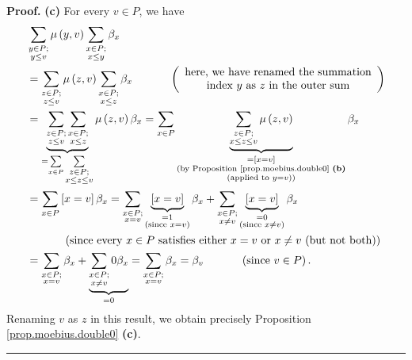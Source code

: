 \documentclass[numbers=enddot,12pt,final,onecolumn,notitlepage]{scrartcl}%
\theoremstyle{definition}
\newenvironment{proof}[1][Proof]{\noindent\textbf{#1.} }{\ \rule{0.5em}{0.5em}}
\newenvironment{vershort}{}{}
\let\sumnonlimits\sum
\renewcommand{\sum}{\sumnonlimits\limits}
\begin{document}
\begin{vershort}
\begin{proof}
\textbf{(c)} For every $v\in P$, we have%
\begin{align*}
&  \sum_{\substack{y\in P;\\y\leq v}}\mu\left(  y,v\right)  \sum
_{\substack{x\in P;\\x\leq y}}\beta_{x}\\
&  =\sum_{\substack{z\in P;\\z\leq v}}\mu\left(  z,v\right)  \sum
_{\substack{x\in P;\\x\leq z}}\beta_{x}\ \ \ \ \ \ \ \ \ \ \left(
\begin{array}
[c]{c}%
\text{here, we have renamed the summation}\\
\text{index }y\text{ as }z\text{ in the outer sum}%
\end{array}
\right) \\
&  =\underbrace{\sum_{\substack{z\in P;\\z\leq v}}\sum_{\substack{x\in
P;\\x\leq z}}}_{=\sum_{x\in P}\sum_{\substack{z\in P;\\x\leq z\leq v}}}%
\mu\left(  z,v\right)  \beta_{x}=\sum_{x\in P}\underbrace{\sum_{\substack{z\in
P;\\x\leq z\leq v}}\mu\left(  z,v\right)  }_{\substack{=\left[  x=v\right]
\\\text{(by Proposition \ref{prop.moebius.double0} \textbf{(b)}}%
\\\text{(applied to }y=v\text{))}}}\beta_{x}\\
&  =\sum_{x\in P}\left[  x=v\right]  \beta_{x}=\sum_{\substack{x\in
P;\\x=v}}\underbrace{\left[  x=v\right]  }_{\substack{=1\\\text{(since
}x=v\text{)}}}\beta_{x}+\sum_{\substack{x\in P;\\x\neq v}}\underbrace{\left[
x=v\right]  }_{\substack{=0\\\text{(since }x\neq v\text{)}}}\beta_{x}\\
&  \ \ \ \ \ \ \ \ \ \ \left(  \text{since every }x\in P\text{ satisfies
either }x=v\text{ or }x\neq v\text{ (but not both)}\right) \\
&  =\sum_{\substack{x\in P;\\x=v}}\beta_{x}+\underbrace{\sum_{\substack{x\in
P;\\x\neq v}}0\beta_{x}}_{=0}=\sum_{\substack{x\in P;\\x=v}}\beta_{x}%
=\beta_{v}\ \ \ \ \ \ \ \ \ \ \left(  \text{since }v\in P\right)  .
\end{align*}
Renaming $v$ as $z$ in this result, we obtain precisely Proposition
\ref{prop.moebius.double0} \textbf{(c)}.
\end{proof}
\end{vershort}
\end{document}
